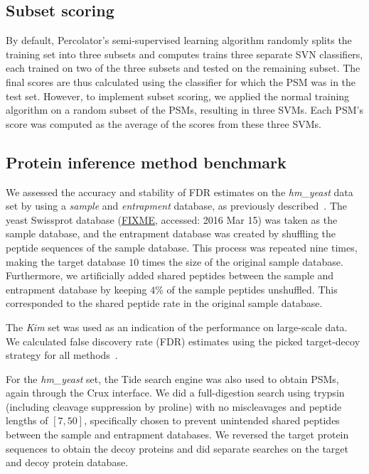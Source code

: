 \documentclass{article}
\begin{document}
\subsection*{Subset scoring}

By default, Percolator's semi-supervised learning algorithm randomly
splits the training set into three subsets and computes trains three
separate SVN classifiers, each trained on two of the three subsets and
tested on the remaining subset.  The final scores are thus calculated
using the classifier for which the PSM was in the test set. However,
to implement subset scoring, we applied the normal training algorithm
on a random subset of the PSMs, resulting in three SVMs.  Each PSM's
score was computed as the average of the scores from these three SVMs.

\subsection*{Protein inference method benchmark}

We assessed the accuracy and stability of FDR estimates on the {\em
  hm\_yeast} data set by using a {\em sample} and {\em entrapment}
database, as previously described~\cite{granholm2013determining}. The
yeast Swissprot database (\url{FIXME}, accessed: 2016 Mar 15) was
taken as the sample database, and the entrapment database was created
by shuffling the peptide sequences of the sample database. This
process was repeated nine times, making the target database $10$ times
the size of the original sample database.  Furthermore, we
artificially added shared peptides between the sample and entrapment
database by keeping $4\%$ of the sample peptides unshuffled.  This 
corresponded to the shared peptide rate in the original sample
database.

The {\em Kim} set was used as an indication of the performance on
large-scale data. We calculated false discovery rate (FDR) estimates
using the picked target-decoy strategy for all
methods~\cite{savitski2015scalable}.

For the {\em hm\_yeast} set, the Tide search engine was also used to
obtain PSMs, again through the Crux interface. We did a full-digestion
search using trypsin (including cleavage suppression by proline) with
no miscleavages and peptide lengths of $[7,50]$, specifically chosen
to prevent unintended shared peptides between the sample and
entrapment databases. We reversed the target protein sequences to
obtain the decoy proteins and did separate searches on the target and
decoy protein database.
\end{document}
